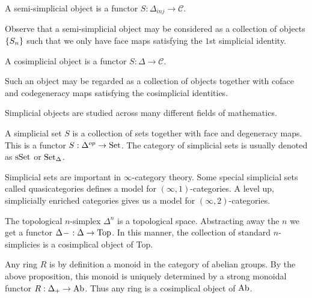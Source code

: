 \documentclass[../thesis.tex]{subfiles}
\begin{document}
        \begin{definition}
            A semi-simplicial object is a functor $S : \Delta_{inj} \rightarrow \mathcal{C}$.
        \end{definition}

        Observe that a semi-simplicial object may be considered as a collection of objects $\startset{S_n}$ such that we only have face maps satisfying the $1$st simplicial identity.
        
        \begin{definition}
            A cosimplicial object is a functor $S:\Delta\rightarrow \mathcal{C}$. 
        \end{definition}
        Such an object may be regarded as a collection of objects together with coface and codegeneracy maps satisfying the cosimplicial identities.
        
        Simplicial objects are studied across many different fields of mathematics.
        \begin{example}
            A simplicial set $S$ is a collection of sets together with face and degeneracy maps. This is a functor $S : \Delta^{op} \rightarrow \tt{Set}$. The category of simplicial sets is usually denoted as $\tt{sSet}$ or $\tt{Set}_\Delta$.

            Simplicial sets are important in $\infty$-category theory. Some special simplicial sets called quasicategories defines a model for $(\infty,1)$-categories. A level up, simplicially enriched categories gives us a model for $(\infty,2)$-categories.
        \end{example}

        \begin{example}
            The topological $n$-simplex $\Delta^n$ is a topological space. Abstracting away the $n$ we get a functor $\Delta^{\argument} : \Delta \rightarrow \tt{Top}$. In this manner, the collection of standard $n$-simplicies is a cosimplical object of Top.
        \end{example}

        \begin{example}[Rings]
            Any ring $R$ is by definition a monoid in the category of abelian groups. By the above proposition, this monoid is uniquely determined by a strong monoidal functor $R : \Delta_+ \rightarrow \tt{Ab}$. Thus any ring is a cosimplical object of $\tt{Ab}$.
        \end{example}
\end{document}
